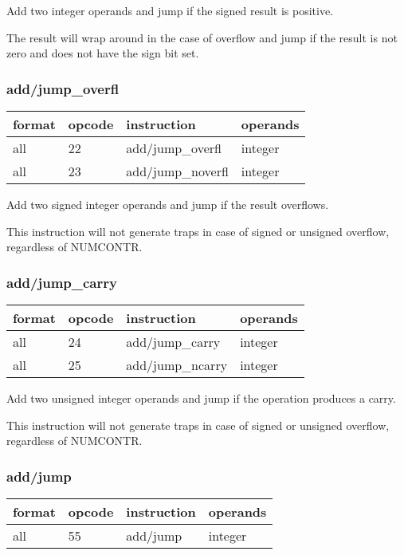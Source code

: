 \documentclass[forwardcom.tex]{subfiles}
\begin{document}
Add two integer operands and jump if the signed result is positive.

The result will wrap around in the case of overflow and jump if the result is not zero and does not have the sign bit set.


\subsubsection{add/jump\_overfl}
\label{table:addJumpOverflInstruction}
\begin{tabular}{|p{16mm}|p{12mm}|p{60mm}|p{50mm}|}
\hline
\bfseries format & \bfseries opcode & \bfseries instruction & \bfseries operands \\ \hline
all & 22 & add/jump\_overfl & integer \\ \hline
all & 23 & add/jump\_noverfl & integer\\ \hline
\end{tabular}
\vspace{2mm}

Add two signed integer operands and jump if the result overflows.
\vspace{2mm}

This instruction will not generate traps in case of signed or unsigned overflow, regardless of  NUMCONTR.
\vspace{2mm}


\subsubsection{add/jump\_carry}
\label{table:addJumpCarryInstruction}
\begin{tabular}{|p{16mm}|p{12mm}|p{60mm}|p{50mm}|}
\hline
\bfseries format & \bfseries opcode & \bfseries instruction & \bfseries operands \\ \hline
all & 24 & add/jump\_carry & integer \\ \hline
all & 25 & add/jump\_ncarry & integer\\ \hline
\end{tabular}
\vspace{2mm}

Add two unsigned integer operands and jump if the operation produces a carry.
\vspace{2mm}

This instruction will not generate traps in case of signed or unsigned overflow, regardless of  NUMCONTR.
\vspace{2mm}


\subsubsection{add/jump}
\label{table:addJumpInstruction}
\begin{tabular}{|p{16mm}|p{12mm}|p{60mm}|p{50mm}|}
\hline
\bfseries format & \bfseries opcode & \bfseries instruction & \bfseries operands \\ \hline
all & 55 & add/jump & integer \\ \hline
\end{tabular}
\vspace{2mm}
\end{document}
